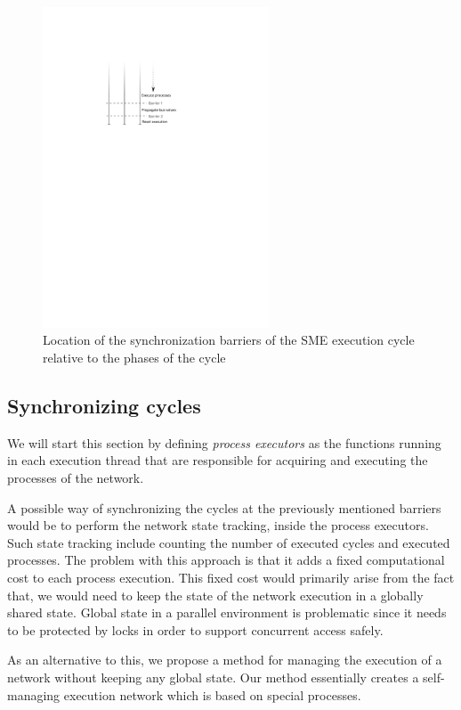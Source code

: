 \begin{figure}
\centering
\includegraphics[width=0.6\textwidth]{figures/barriers}
\caption[Location of synchronization barriers]{Location of the
  synchronization barriers of the SME execution cycle relative to the
  phases of the cycle}
\label{fig:barriers}
\end{figure}



\subsection{Synchronizing cycles}
\label{sec:sync}
We will start this section by defining \textit{process executors}
as the functions running in each execution thread that are responsible
for acquiring and executing the processes of the network.

A possible way of synchronizing the cycles at the previously mentioned
barriers would be to perform the network state tracking, inside the
process executors. Such state tracking include counting the number of
executed cycles and executed processes. The problem with this approach
is that it adds a fixed computational cost to each process
execution. This fixed cost would primarily arise from the fact that,
we would need to keep the state of the network execution in a globally
shared state. Global state in a parallel environment is
problematic since it needs to be protected by locks in order to
support concurrent access safely.

As an alternative to this, we propose a method for managing the
execution of a network without keeping any global state. Our method
essentially creates a self-managing execution network which is based
on special processes.

